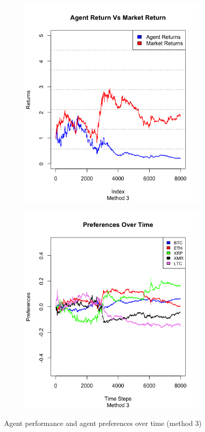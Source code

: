 \documentclass[a4paper,12pt]{article}
\begin{document}
\begin{figure}[h!]
  \centering
  \begin{subfigure}[b]{0.4\linewidth}
    \includegraphics[width=\linewidth]{figures/agt_vs_mkt3.png}
  \end{subfigure}
  \begin{subfigure}[b]{0.4\linewidth}
    \includegraphics[width=\linewidth]{figures/prefs3.png}
  \end{subfigure}
  \caption{Agent performance and agent preferences over time (method 3)}
  \label{fig:method3}
\end{figure}
\end{document}
